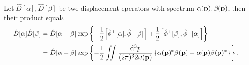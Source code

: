 \begin{lemma}\label{thm:qkg_displacement_product}
	Let $\hat{D}[\alpha],\hat{D}[\beta]$ be two displacement operators with spectrum $\alpha(\vb{p}),\beta(\vb{p})$, then their product equals
	\begin{equation}\label{eq:qkg_displacement_product}
		\begin{split}
			\hat{D}[\alpha]
			\hat{D}[\beta]
			&=
			\hat{D}[\alpha+\beta]
			\exp\left\{
				-
				\frac{1}{2}
				\comm{\hat\phi^+[\alpha]}{\hat\phi^-[\beta]}
				+
				\frac{1}{2}
				\comm{\hat\phi^+[\beta]}{\hat\phi^-[\alpha]}
			\right\}
			\\
			&=
			\hat{D}[\alpha+\beta]
			\exp\left\{
				-
				\frac{1}{2}
				\iint\frac{\dd[3]{p}}{(2\pi)^32\omega(\vb{p})}
				\left\{
					\alpha(\vb{p})^*
					\beta(\vb{p})
					-
					\alpha(\vb{p})
					\beta(\vb{p})^*
				\right\}
			\right\}
			.
		\end{split}
	\end{equation}
\end{lemma}
